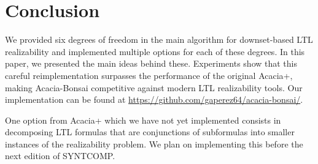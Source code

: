 \documentclass[runningheads,a4paper]{llncs}
\begin{document}
\section{Conclusion}

We provided six degrees of freedom in the main algorithm for downset-based LTL
realizability and implemented multiple options for each of these degrees.  In
this paper, we presented the main ideas behind these.  Experiments show that
this careful reimplementation surpasses the performance of the original
Acacia+, making Acacia-Bonsai competitive against modern LTL realizability
tools. Our implementation can be found at \url{https://github.com/gaperez64/acacia-bonsai/}.

One option from Acacia+ which we have not yet implemented consists in
decomposing LTL formulas that are conjunctions of subformulas into smaller
instances of the realizability problem. We plan on implementing this before
the next edition of SYNTCOMP.



\end{document}
